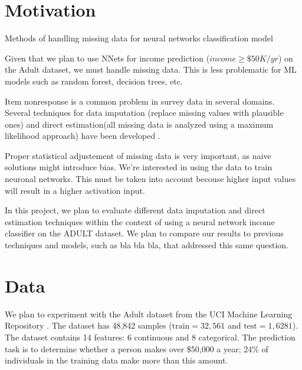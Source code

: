 \documentclass[12pt]{article}
\begin{document}
\maketitle

\section{Motivation}

Methods of handling missing data for neural networks classification model

Given that we plan to use NNets for income prediction ($income \geq \$ 50K/yr$) on the Adult dataset, we must handle missing data. This is less problematic for ML models such as random forest, decision trees, etc.


Item nonresponse is a common problem in survey data in several domains. Several techniques for data imputation (replace missing values with plausible ones) and direct estimation(all missing data is analyzed using a maximum likelihood approach) have been developed \cite{de2003prevention}.

Proper statistical adjustement of missing data is very important, as naive solutions might introduce bias. We're interested in using the data to train neuronal networks. This must be taken into account becouse higher input values will result in a higher activation input.

In this project, we plan to evaluate different data imputation and direct estimation techniques within the context of using a neural network income classifier on the ADULT dataset. We plan to compare our results to previous techniques and models, such as bla bla bla, that addressed this same question.

\section{Data}


We plan to experiment with the Adult dataset from the UCI Machine Learning Repository \citep{Lichman2013}. The dataset has 48,842 samples ($\mathrm{train}=32,561$ and $\mathrm{test}=1,6281$). The dataset contains 14 features: 6 continuous and 8 categorical. The prediction task is to determine whether a person makes over \$50,000 a year; 24\% of individuals in the training data make more than this amount. \\
\end{document}
